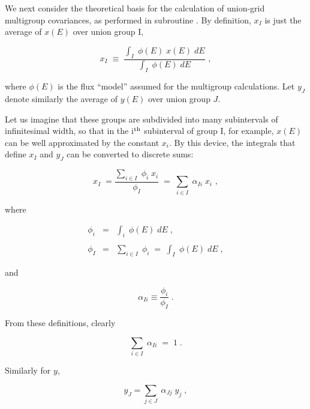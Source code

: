 We next consider the theoretical basis for the calculation of
union-grid multigroup covariances, as performed in subroutine
.  By definition, $x_I$
is just the average of $x(E)$ over union group I,

\begin{equation}
   x_I \; \equiv \;\frac  {\displaystyle\int_I \; \phi (E) \; x(E) \;
  dE}{\displaystyle\int_I \; \phi (E) \; dE} \,\,,
\label{e19}
\end{equation}

\noindent
where $\phi (E)$ is the flux ``model'' assumed for the multigroup
calculations.  Let $y_J$ denote similarly the average of $y(E)$ over
union group $J$.

Let us imagine that these groups are subdivided into many subintervals
of infinitesimal width, so that in the i$^{\rm{th}}$ subinterval of group I,
for example, $x(E)$ can be well approximated by the constant $x_i$.  By
this device, the integrals that define $x_I$ and $y_J$ can be converted
to discrete sums:

\begin{equation}
x_I \; = \frac{{\displaystyle \sum_{i\in I}} \; \phi_i \; x_i}{\phi_I } \; = \;
\sum_{i\in I} \; \alpha_{Ii} \; x_i\,\,,
\label{e20}
\end{equation}

\noindent
where

\begin{eqnarray}
\phi_i & = & \int_{i} \; \phi (E) \; dE \;,\\
\nonumber \\
\phi_I & = & \sum_{i\in I} \; \phi_{i} \; = \; \int_{I} \; \phi (E) \; dE\;,
\end{eqnarray}

\noindent
and

\begin{equation}
\alpha_{Ii} \equiv \frac{\phi_i}{\phi_I} \; .
\end{equation}

\noindent
From these definitions, clearly

\begin {equation}
\sum_{i\in I}\; \alpha_{Ii} \; = \; 1 \; .
\label{e24}
\end{equation}

\noindent
Similarly for $y$,

\begin{equation}
y_J = \sum_{j\in J} \; \alpha_{Jj} \; y_j\;,
\label{e25}
\end{equation}

